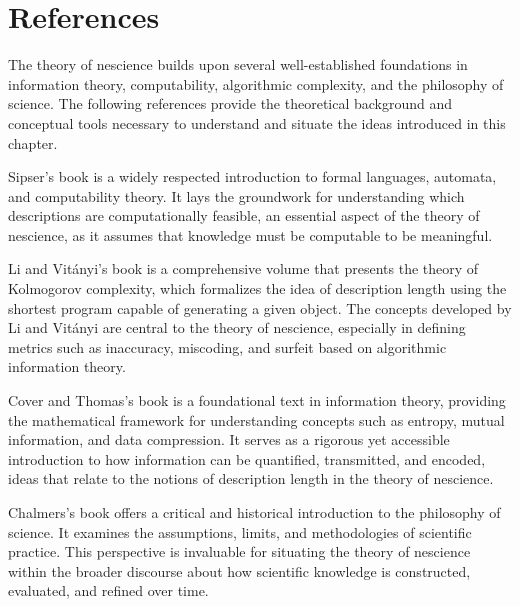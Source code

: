 %
%

\section*{References}

The theory of nescience builds upon several well-established foundations in information theory, computability, algorithmic complexity, and the philosophy of science. The following references provide the theoretical background and conceptual tools necessary to understand and situate the ideas introduced in this chapter.
 
Sipser's book \cite{sipser2012introduction} is a widely respected introduction to formal languages, automata, and computability theory. It lays the groundwork for understanding which descriptions are computationally feasible, an essential aspect of the theory of nescience, as it assumes that knowledge must be computable to be meaningful.

Li and Vitányi's book \cite{li2013introduction} is a comprehensive volume that presents the theory of Kolmogorov complexity, which formalizes the idea of description length using the shortest program capable of generating a given object. The concepts developed by Li and Vitányi are central to the theory of nescience, especially in defining metrics such as inaccuracy, miscoding, and surfeit based on algorithmic information theory.

Cover and Thomas's book \cite{cover2012elements} is a foundational text in information theory, providing the mathematical framework for understanding concepts such as entropy, mutual information, and data compression. It serves as a rigorous yet accessible introduction to how information can be quantified, transmitted, and encoded, ideas that relate to the notions of description length in the theory of nescience.

Chalmers's book \cite{chalmers2013thing} offers a critical and historical introduction to the philosophy of science. It examines the assumptions, limits, and methodologies of scientific practice. This perspective is invaluable for situating the theory of nescience within the broader discourse about how scientific knowledge is constructed, evaluated, and refined over time.
